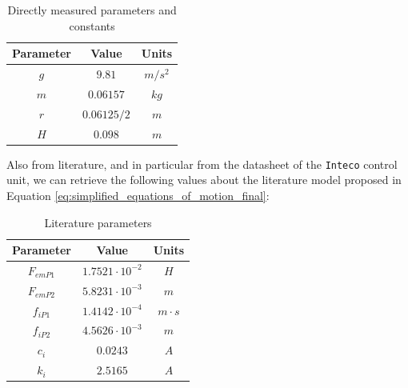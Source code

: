\begin{table}[H]

    \centering
    \begin{tabular}{|c|c|c|}
        \hline
        \textbf{Parameter} & \textbf{Value} & \textbf{Units} \\
        \hline
        $g$                & $9.81$         & $m/s^2$        \\
        $m$                & $0.06157$      & $kg$           \\
        $r$                & $0.06125/2$    & $m$            \\
        $H$                & $0.098$        & $m$            \\
        \hline
    \end{tabular}

    \caption{Directly measured parameters and constants}
    \label{tab:directly_measured_parameters}

\end{table}

Also from literature, and in particular from the datasheet of the \texttt{Inteco} control unit, we can retrieve the following values about the literature model proposed in Equation \ref{eq:simplified_equations_of_motion_final}:

\begin{table}[H]

    \centering
    \begin{tabular}{|c|c|c|}
        \hline
        \textbf{Parameter} & \textbf{Value}         & \textbf{Units} \\
        \hline
        $F_{emP1}$         & $1.7521 \cdot 10^{-2}$ & $H$            \\
        $F_{emP2}$         & $5.8231 \cdot 10^{-3}$ & $m$            \\
        $f_{iP1}$          & $1.4142 \cdot 10^{-4}$ & $m \cdot s$    \\
        $f_{iP2}$          & $4.5626 \cdot 10^{-3}$ & $m$            \\
        $c_i$              & $0.0243$               & $A$            \\
        $k_i$              & $2.5165$               & $A$            \\
        \hline
    \end{tabular}

    \caption{Literature parameters}
    \label{tab:literature_parameters}

\end{table}


